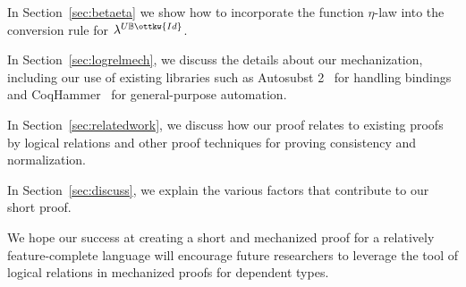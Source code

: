 \documentclass[acmsmall,screen=true,
\ifpublic review=false\else,review=true\fi
  ,anonymous=\ifanonymous true\else false\fi]{acmart}
\newcommand{\lang}{$\lambda^{U\mathbb{B}\ottkw{Id}}$\xspace}
\begin{document}
In Section~\ref{sec:betaeta} we show how to incorporate the function $\eta$-law
into the conversion rule for \lang{}.

In Section~\ref{sec:logrelmech}, we discuss the details about our
mechanization, including our use of existing libraries such as
Autosubst 2~\citep{autosubst2} for handling bindings and
CoqHammer~\citep{czajka2018hammer} for general-purpose automation.

In Section~\ref{sec:relatedwork}, we discuss how our proof relates to
existing proofs by logical relations and other proof techniques for
proving consistency and normalization.

In Section~\ref{sec:discuss}, we explain the various factors that contribute
to our short proof.

We hope our success at creating a short and mechanized proof for a
relatively feature-complete language will encourage future researchers
to leverage the tool of logical relations in mechanized
proofs for dependent types.











\end{document}
